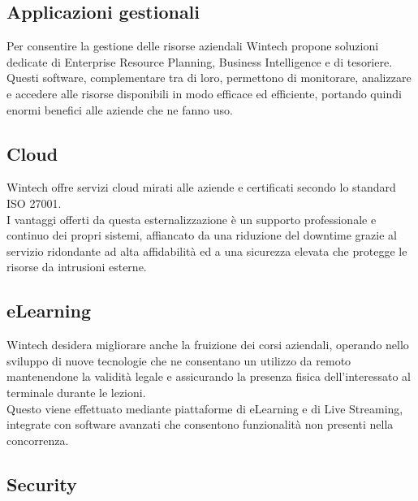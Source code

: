 \documentclass[Tesi.tex]{subfiles}
\begin{document}
\subsection{Applicazioni gestionali}
Per consentire la gestione delle risorse aziendali Wintech propone soluzioni dedicate di Enterprise Resource Planning, Business Intelligence e di tesoriere. \\
Questi software, complementare tra di loro, permettono di monitorare, analizzare e accedere alle risorse disponibili in modo efficace ed efficiente, portando quindi enormi benefici alle aziende che ne fanno uso.

\subsection{Cloud}
Wintech offre servizi cloud mirati alle aziende e certificati secondo lo standard ISO 27001. \\
I vantaggi offerti da questa esternalizzazione è un supporto professionale e continuo dei propri sistemi, affiancato da una riduzione del downtime grazie al servizio ridondante ad alta affidabilità ed a una sicurezza elevata che protegge le risorse da intrusioni esterne.

\subsection{eLearning}
Wintech desidera migliorare anche la fruizione dei corsi aziendali, operando nello sviluppo di nuove tecnologie che ne consentano un utilizzo da remoto mantenendone la validità legale e assicurando la presenza fisica dell'interessato al terminale durante le lezioni. \\
Questo viene effettuato mediante piattaforme di eLearning e di Live Streaming, integrate con software avanzati che consentono funzionalità non presenti nella concorrenza.

\subsection{Security}
\end{document}
